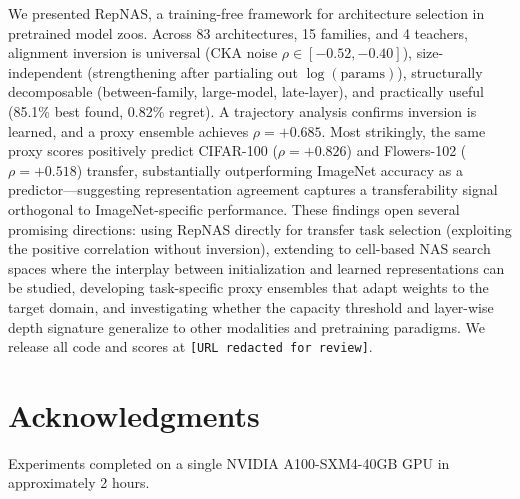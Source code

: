 \documentclass[10pt,twocolumn,letterpaper]{article}
\begin{document}
We presented RepNAS, a training-free framework for architecture selection in pretrained model zoos.
Across 83 architectures, 15 families, and 4 teachers, alignment inversion is universal (CKA noise $\rho \in [-0.52, -0.40]$), size-independent (strengthening after partialing out $\log(\text{params})$), structurally decomposable (between-family, large-model, late-layer), and practically useful (85.1\% best found, 0.82\% regret).
A trajectory analysis confirms inversion is learned, and a proxy ensemble achieves $\rho = +0.685$.
Most strikingly, the same proxy scores positively predict CIFAR-100 ($\rho = +0.826$) and Flowers-102 ($\rho = +0.518$) transfer, substantially outperforming ImageNet accuracy as a predictor---suggesting representation agreement captures a transferability signal orthogonal to ImageNet-specific performance.
These findings open several promising directions: using RepNAS directly for transfer task selection (exploiting the positive correlation without inversion), extending to cell-based NAS search spaces where the interplay between initialization and learned representations can be studied, developing task-specific proxy ensembles that adapt weights to the target domain, and investigating whether the capacity threshold and layer-wise depth signature generalize to other modalities and pretraining paradigms.
We release all code and scores at \texttt{[URL redacted for review]}.


\section*{Acknowledgments}
Experiments completed on a single NVIDIA A100-SXM4-40GB GPU in approximately 2 hours.

{
    \small
    
    
}
\end{document}
